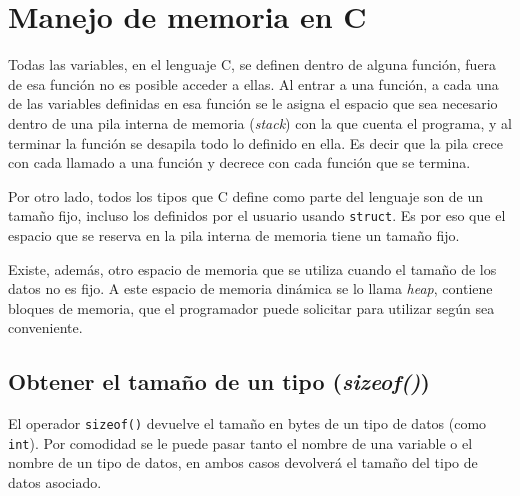 
%

\renewcommand{\chaptermark}[1]{\markboth{#1}{}}
\renewcommand{\thesection}{\arabic{section}}
\chapter*{Manejo de memoria en C}

Todas las variables, en el lenguaje C, se definen dentro de alguna función,
fuera de esa función no es posible acceder a ellas.  Al entrar a una función,
a cada una de las variables definidas en esa función se le asigna el espacio
que sea necesario dentro de una pila interna de memoria (\textit{stack}) con
la que cuenta el programa, y al terminar la función se desapila todo lo
definido en ella. Es decir que la pila crece con cada llamado a una función y
decrece con cada función que se termina.

Por otro lado, todos los tipos que C define como parte del lenguaje son de un
tamaño fijo, incluso los definidos por el usuario usando \lstinline!struct!.
Es por eso que el espacio que se reserva en la pila interna de memoria tiene
un tamaño fijo.

Existe, además, otro espacio de memoria que se utiliza cuando el tamaño de los
datos no es fijo.  A este espacio de memoria dinámica se lo llama
\textit{heap}, contiene bloques de memoria, que el programador puede solicitar
para utilizar según sea conveniente.

\section{Obtener el tamaño de un tipo (\textit{sizeof()})}

El operador \lstinline!sizeof()! devuelve el tamaño en bytes de un tipo de
datos (como \lstinline!int!). Por comodidad se le puede pasar tanto el nombre
de una variable o el nombre de un tipo de datos, en ambos casos devolverá el
tamaño del tipo de datos asociado.

